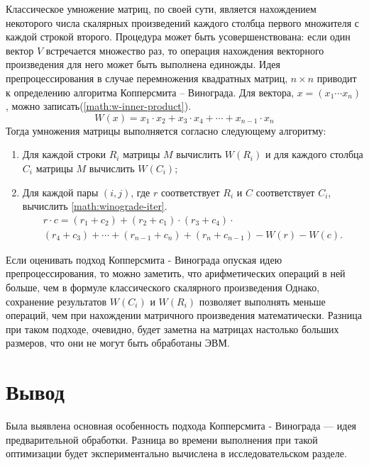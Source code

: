 Классическое умножение матриц, по своей сути, является нахождением некоторого числа скалярных произведений каждого столбца первого множителя с каждой строкой второго. Процедура может быть усовершенствована: если один вектор $V$ встречается множество раз, то операция нахождения векторного произведения для него может быть выполнена единожды. Идея препроцессирования в случае перемножения квадратных матриц, $n \times n$ приводит к определению алгоритма Копперсмита – Винограда. Для вектора, $x = \left(x_1 \cdots x_n\right)$, можно записать(\ref{math:w-inner-product}).
\begin{equation}\label{math:w-inner-product}
	W(x) = x_1 \cdot x_2 + x_3 \cdot x_4 + \cdots + x_{n - 1} \cdot x_n
\end{equation}
Тогда умножения матрицы выполняется согласно следующему алгоритму:
\begin{enumerate}
	\item Для каждой строки $R_i$ матрицы $M$ вычислить $W(R_i)$ и для каждого столбца $C_i$ матрицы $M$ вычислить $W(C_i)$;
	\item Для каждой пары $(i ,j)$, где $r$ соответствует $R_i$ и $C$ соответствует $C_i$, вычислить \ref{math:winograde-iter}.
	\begin{equation}\label{math:winograde-iter} 
		\begin{array}{cc}
			r \cdot c = \left(r_1 + c_2\right) + \left(r_2 + c_1\right) \cdot \left(r_3 + c_4\right) \cdot \\
			\left(r_4 + c_3\right) + \cdots +  \left(r_{n - 1} + c_n\right) + \left(r_{n} + c_{n - 1}\right) - W\left(r\right) - W\left(c\right).
		\end{array}
	\end{equation}
\end{enumerate}

Если оценивать подход Копперсмита - Винограда опуская идею препроцессирования, то можно заметить, что арифметических операций в ней больше, чем в формуле классического скалярного произведения Однако, сохранение результатов $W(C_i)$ и $W(R_i)$ позволяет выполнять меньше операций, чем при нахождении матричного произведения математически. Разница при таком подходе, очевидно, будет заметна на матрицах настолько больших размеров, что они не могут быть обработаны ЭВМ. 

\section*{Вывод}
Была выявлена основная особенность подхода Копперсмита - Винограда --- идея предварительной обработки. Разница во времени выполнения при такой оптимизации будет экспериментально вычислена в исследовательском разделе. 